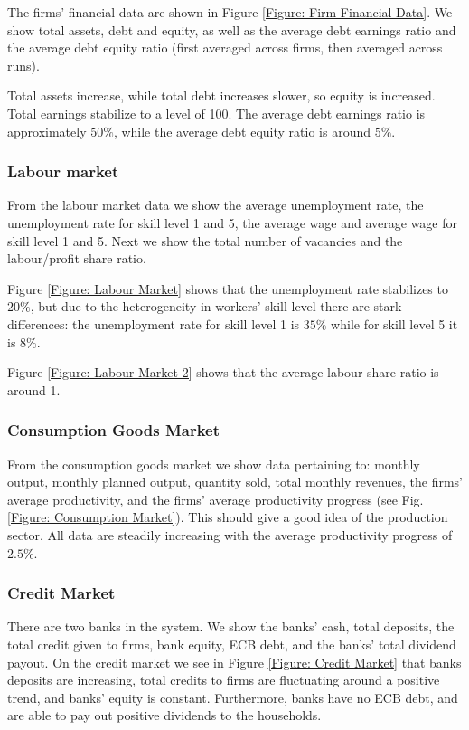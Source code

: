 The firms' financial data are shown in Figure \ref{Figure: Firm Financial Data}. We show total assets, debt and equity, as well as
the average debt earnings ratio and the average debt equity ratio (first averaged across firms, then averaged across runs).

Total assets increase, while total debt increases slower, so equity is increased. Total earnings stabilize to a level of 100.
The average debt earnings ratio is approximately $50\%$, while the average debt equity ratio is around $5\%$.

\subsubsection*{Labour market}
From the labour market data we show the average unemployment rate, the unemployment rate for skill level 1 and 5, the average wage and 
average wage for skill level 1 and 5. Next we show the total number of vacancies and the labour/profit share ratio.

Figure \ref{Figure: Labour Market} shows that the unemployment rate stabilizes to $20\%$, but due to the heterogeneity in workers' skill level there are stark differences: the unemployment rate for skill level 1 is $35\%$ while for skill level  5 it is $8\%$.

Figure \ref{Figure: Labour Market 2} shows that the average labour share ratio is around 1.

\subsubsection*{Consumption Goods Market}
From the consumption goods market we show data pertaining to: monthly output, monthly planned output, quantity sold, total monthly revenues,
the firms' average productivity, and the firms' average productivity progress (see Fig. \ref{Figure: Consumption Market}). This should give a good idea of the production sector.
All data are steadily increasing with the average productivity progress of $2.5\%$.

\subsubsection*{Credit Market}
There are two banks in the system. 
We show the banks' cash, total deposits, the total credit given to firms, bank equity, ECB debt, and the banks' total dividend payout.
On the credit market we see in Figure \ref{Figure: Credit Market} that banks deposits are increasing, total credits to firms are fluctuating around a positive trend, and banks' equity is constant. Furthermore, banks have no ECB debt, and are able to pay out positive dividends to the households.


